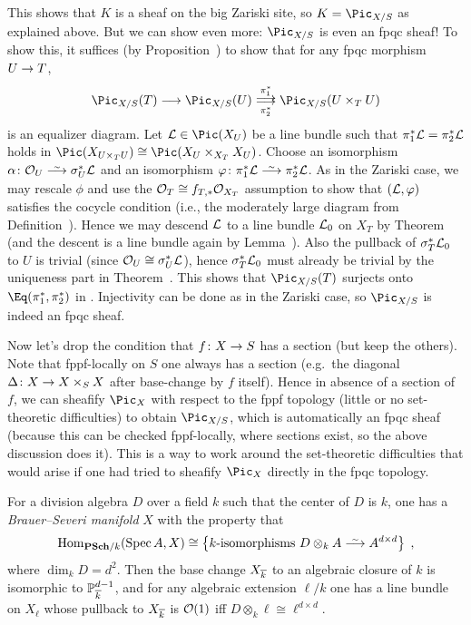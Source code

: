 \documentclass[a4paper,parskip=half,numbers=enddot, DIV=12]{scrreprt}
\begin{document}
\begin{example}
	This shows that $K$ is a sheaf on the big Zariski site, so $K=\Pic_{X/S}$ as explained above. But we can show even more: $\Pic_{X/S}$ is even an fpqc sheaf! To show this, it suffices (by Proposition~) to show that for any fpqc morphism $U\morphism T$,
	\begin{align}\lbl{eq:PicfpqcSheaf}
		\Pic_{X/S}(T)\morphism \Pic_{X/S}(U)\doublemorphism[\pi_1^*][\pi_2^*]\Pic_{X/S}(U\times_TU)
	\end{align}
	is an equalizer diagram. Let $\Ll\in\Pic(X_U)$ be a line bundle such that $\pi_1^*\mathcal{L}=\pi_2^*\mathcal{L}$ holds in $\Pic(X_{U\times_TU})\cong\Pic(X_U\times_{X_T}X_U)$. Choose an isomorphism $\alpha\colon \Oo_U\isomorphism \sigma_U^*\Ll$ and an isomorphism $\phi\colon \pi_1^*\Ll\isomorphism \pi_2^*\Ll$. As in the Zariski case, we may rescale $\phi$ and use the $\mathcal{O}_T\cong f_{T,*}\mathcal{O}_{X_T}$ assumption to show that $(\mathcal{L},\varphi)$ satisfies the cocycle condition (i.e., the moderately large diagram from Definition~). Hence we may descend $\mathcal{L}$ to a line bundle $\mathcal{L}_0$ on $X_T$ by Theorem~ (and the descent is a line bundle again by Lemma~). Also the pullback of $\sigma_T^*\mathcal{L}_0$ to $U$ is trivial (since $\mathcal{O}_U\cong \sigma_U^*\mathcal{L}$), hence $\sigma_T^*\mathcal{L}_0$ must already be trivial by the uniqueness part in Theorem~. This shows that $\Pic_{X/S}(T)$ surjects onto $\Eq(\pi_1^*,\pi_2^*)$ in . Injectivity can be done as in the Zariski case, so $\Pic_{X/S}$ is indeed an fpqc sheaf.
	
	Now let's drop the condition that $f\colon X\morphism S$ has a section (but keep the others). Note that fppf-locally on $S$ one always has a section (e.g.\ the diagonal $\Delta\colon X\morphism X\times_SX$ after base-change by $f$ itself). Hence in absence of a section of $f$, we can sheafify $\Pic_X$ with respect to the fppf topology (little or no set-theoretic difficulties) to obtain $\Pic_{X/S}$, which is automatically an fpqc sheaf (because this can be checked fppf-locally, where sections exist, so the above discussion does it). This is a way to work around the set-theoretic difficulties that would arise if one had tried to sheafify $\Pic_X$ directly in the fpqc topology.
\end{example}
\begin{example}
	For a division algebra $D$ over a field $k$ such that the center of $D$ is $k$, one has a \emph{Brauer--Severi manifold} $X$ with the property that
	\begin{align*}
		\Hom_{\cat{PSch}/k}(\Spec A,X)\cong \left\{k\text{-isomorphisms }D\otimes_kA\isomorphism A^{d\times d}\right\}\;,
	\end{align*}
	where $\dim_kD=d^2$. Then the base change $X_{\overline{k}}$ to an algebraic closure of $k$ is isomorphic to $\mathbb{P}_{\overline{k}}^{d-1}$, and for any algebraic extension $\ell/k$ one has a line bundle on $X_\ell$ whose pullback to $X_{\overline{k}}$ is $\mathcal{O}(1)$ iff $D\otimes_k\ell\cong\ell^{d\times d}$.
\end{example}
\end{document}
